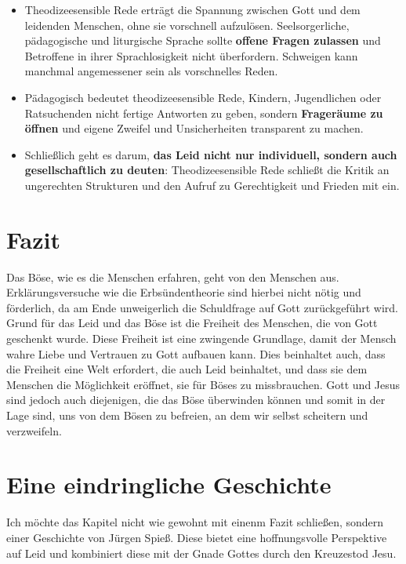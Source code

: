 \begin{itemize}
    \item Theodizeesensible Rede erträgt die Spannung zwischen Gott und dem leidenden Menschen, ohne sie vorschnell aufzulösen. Seelsorgerliche, pädagogische und liturgische Sprache sollte \textbf{offene Fragen zulassen} und Betroffene in ihrer Sprachlosigkeit nicht überfordern. Schweigen kann manchmal angemessener sein als vorschnelles Reden.
    \item Pädagogisch bedeutet theodizeesensible Rede, Kindern, Jugendlichen oder Ratsuchenden nicht fertige Antworten zu geben, sondern \textbf{Frageräume zu öffnen} und eigene Zweifel und Unsicherheiten transparent zu machen.
    \item Schließlich geht es darum, \textbf{das Leid nicht nur individuell, sondern auch gesellschaftlich zu deuten}: Theodizeesensible Rede schließt die Kritik an ungerechten Strukturen und den Aufruf zu Gerechtigkeit und Frieden mit ein.
\end{itemize}

\section{Fazit}
Das Böse, wie es die Menschen erfahren, geht von den Menschen aus. Erklärungsversuche wie die Erbsündentheorie sind hierbei nicht nötig und förderlich, da am Ende unweigerlich die Schuldfrage auf Gott zurückgeführt wird. Grund für das Leid und das Böse ist die Freiheit des Menschen, die von Gott geschenkt wurde. Diese Freiheit ist eine zwingende Grundlage, damit der Mensch wahre Liebe und Vertrauen zu Gott aufbauen kann. Dies beinhaltet auch, dass die Freiheit eine Welt erfordert, die auch Leid beinhaltet, und dass sie dem Menschen die Möglichkeit eröffnet, sie für Böses zu missbrauchen. Gott und Jesus sind jedoch auch diejenigen, die das Böse überwinden können und somit in der Lage sind, uns von dem Bösen zu befreien, an dem wir selbst scheitern und verzweifeln. \\

\noindent{}

\section{Eine eindringliche Geschichte}
Ich möchte das Kapitel nicht wie gewohnt mit einenm Fazit schließen, sondern einer Geschichte von Jürgen Spieß. Diese bietet eine hoffnungsvolle Perspektive auf Leid und kombiniert diese mit der Gnade Gottes durch den Kreuzestod Jesu.